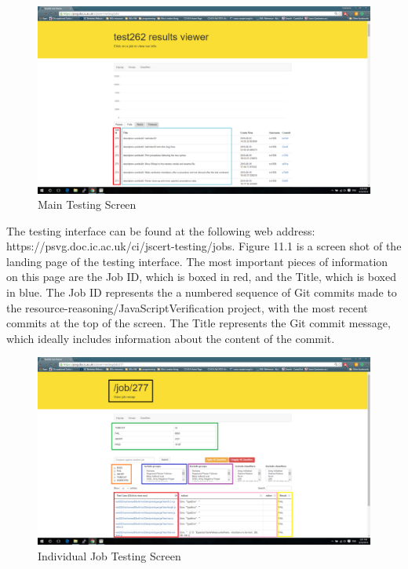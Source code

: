 \documentclass[a4paper,11pt,twoside]{report}
\begin{document}
\begin{figure}[h!]
  \caption{Main Testing Screen}
  \includegraphics[width=1.0\textwidth]{main_testing_screen_boxed}
\end{figure}

The testing interface can be found at the following web address: https://psvg.doc.ic.ac.uk/ci/jscert-testing/jobs. Figure 11.1 is a screen shot of the landing page of the testing interface. The most important pieces of information on this page are the Job ID, which is boxed in red, and the Title, which is boxed in blue. The Job ID represents the a numbered sequence of Git commits made to the resource-reasoning/JavaScriptVerification project, with the most recent commits at the top of the screen. The Title represents the Git commit message, which ideally includes information about the content of the commit.

\begin{figure}[h!]
  \caption{Individual Job Testing Screen}
  \includegraphics[width=1.0\textwidth]{job_testing_screen_boxed}
\end{figure}
\end{document}

